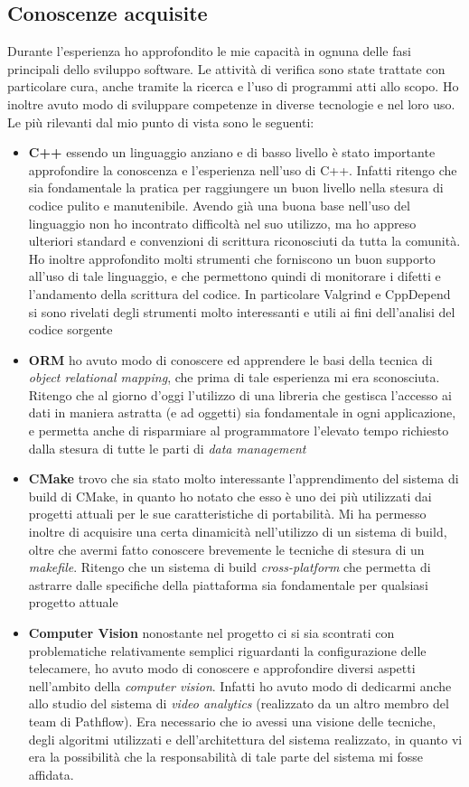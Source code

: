 \subsection{Conoscenze acquisite}
Durante l'esperienza ho approfondito le mie capacità in ognuna delle fasi principali dello sviluppo software. Le attività di verifica sono state trattate con particolare cura, anche tramite la ricerca e l'uso di programmi atti allo scopo. Ho inoltre avuto modo di sviluppare competenze in diverse tecnologie e nel loro uso.
Le più rilevanti dal mio punto di vista sono le seguenti:
\begin{itemize}
	\item \textbf{C++} essendo un linguaggio anziano e di basso livello è stato importante approfondire la conoscenza e l'esperienza nell'uso di C++. Infatti ritengo che sia fondamentale la pratica per raggiungere un buon livello nella stesura di codice pulito e manutenibile. Avendo già una buona base nell'uso del linguaggio non ho incontrato difficoltà nel suo utilizzo, ma ho appreso ulteriori standard e convenzioni di scrittura riconosciuti da tutta la comunità. Ho inoltre approfondito molti strumenti che forniscono un buon supporto all'uso di tale linguaggio, e che permettono quindi di monitorare i difetti e l'andamento della scrittura del codice. In particolare Valgrind e CppDepend si sono rivelati degli strumenti molto interessanti e utili ai fini dell'analisi del codice sorgente
	\item \textbf{ORM} ho avuto modo di conoscere ed apprendere le basi della tecnica di \textit{object relational mapping}, che prima di tale esperienza mi era sconosciuta. Ritengo che al giorno d'oggi l'utilizzo di una libreria che gestisca l'accesso ai dati in maniera astratta (e ad oggetti) sia fondamentale in ogni applicazione, e permetta anche di risparmiare al programmatore l'elevato tempo richiesto dalla stesura di tutte le parti di \textit{data management}
	\item \textbf{CMake} trovo che sia stato molto interessante l'apprendimento del sistema di build di CMake, in quanto ho notato che esso è uno dei più utilizzati dai progetti attuali per le sue caratteristiche di portabilità. Mi ha permesso inoltre di acquisire una certa dinamicità nell'utilizzo di un sistema di build, oltre che avermi fatto conoscere brevemente le tecniche di stesura di un \textit{makefile}. Ritengo che un sistema di build \textit{cross-platform} che permetta di astrarre dalle specifiche della piattaforma sia fondamentale per qualsiasi progetto attuale
	\item \textbf{Computer Vision} nonostante nel progetto ci si sia scontrati con problematiche relativamente semplici riguardanti la configurazione delle telecamere, ho avuto modo di conoscere e approfondire diversi aspetti nell'ambito della \textit{computer vision}. Infatti ho avuto modo di dedicarmi anche allo studio del sistema di \textit{video analytics} (realizzato da un altro membro del team di Pathflow). Era necessario che io avessi una visione delle tecniche, degli algoritmi utilizzati e dell'architettura del sistema realizzato, in quanto vi era la possibilità che la responsabilità di tale parte del sistema mi fosse affidata. 

\end{itemize}
